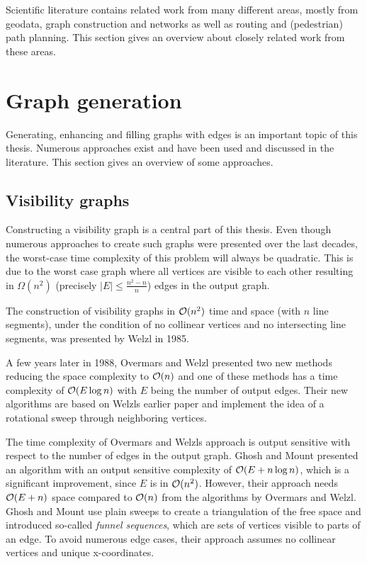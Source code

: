 
Scientific literature contains related work from many different areas, mostly from geodata, graph construction and networks as well as routing and (pedestrian) path planning.
This section gives an overview about closely related work from these areas.

\section{Graph generation}
\label{sec:graph-generation}

	Generating, enhancing and filling graphs with edges is an important topic of this thesis.
	Numerous approaches exist and have been used and discussed in the literature.
	This section gives an overview of some approaches.

	\subsection{Visibility graphs}
	\label{subsec:related-work:visibility-graph}

		Constructing a visibility graph is a central part of this thesis.
		Even though numerous approaches to create such graphs were presented over the last decades, the worst-case time complexity of this problem will always be quadratic.
		This is due to the worst case graph where all vertices are visible to each other resulting in $\Omega(n^2)$ (precisely $|E| \leq \frac{n^2-n}{n}$) edges in the output graph.
		
		The construction of visibility graphs in $\mathcal{O}(n^2)$ time and space (with $n$ line segments), under the condition of no collinear vertices and no intersecting line segments, was presented by Welzl in 1985\cite{welzl-visibility-graph}.
		
		A few years later in 1988, Overmars and Welzl presented two new methods reducing the space complexity to $\mathcal{O}(n)$\cite{overmars-weizl-visibility-graph} and one of these methods has a time complexity of $\mathcal{O}(E \log n)$ with $E$ being the number of output edges.
		Their new algorithms are based on Welzls earlier paper and implement the idea of a rotational sweep through neighboring vertices.
		
		The time complexity of Overmars and Welzls approach is output sensitive with respect to the number of edges in the output graph\cite{ghosh-output-sensitive-vgraph}.
		Ghosh and Mount presented an algorithm with an output sensitive complexity of $\mathcal{O}(E + n \log n)$, which is a significant improvement, since $E$ is in $\mathcal{O}(n^2)$.
		However, their approach needs $\mathcal{O}(E + n)$ space compared to $\mathcal{O}(n)$ from the algorithms by Overmars and Welzl.
		Ghosh and Mount use plain sweeps to create a triangulation of the free space and introduced so-called \emph{funnel sequences}, which are sets of vertices visible to parts of an edge.
		To avoid numerous edge cases, their approach assumes no collinear vertices and unique x-coordinates.
		
